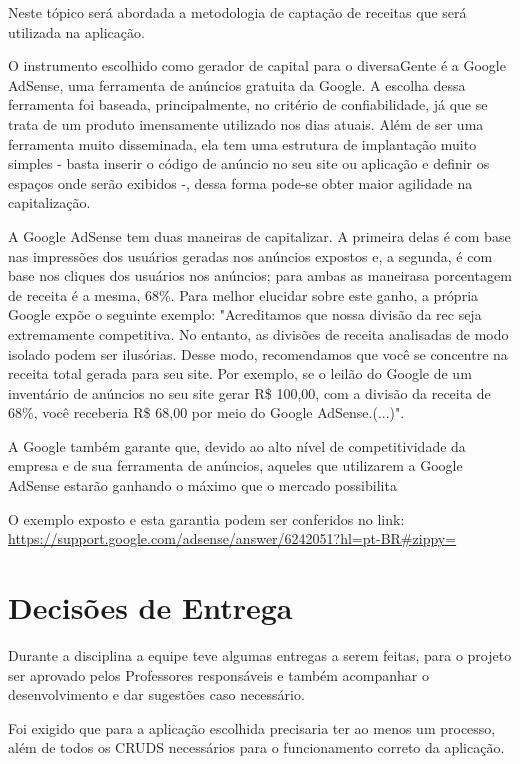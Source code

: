 Neste tópico será abordada a metodologia de captação de receitas que será utilizada na aplicação.

O instrumento escolhido como gerador de capital para o diversaGente é a Google AdSense, uma ferramenta de anúncios gratuita da Google. A escolha dessa ferramenta foi baseada, principalmente, no critério de confiabilidade, já que se trata de um produto imensamente utilizado nos dias atuais. Além de ser uma ferramenta muito disseminada, ela tem uma estrutura de implantação muito simples - basta inserir o código de anúncio no seu site ou aplicação e definir os espaços onde serão exibidos -, dessa forma pode-se obter maior agilidade na capitalização.

A Google AdSense tem duas maneiras de capitalizar. A primeira delas é com base nas impressões dos usuários geradas nos anúncios expostos e, a segunda, é com base nos cliques dos usuários nos anúncios; para ambas as maneirasa porcentagem de receita é a mesma, 68\%. Para melhor elucidar sobre este ganho, a própria Google expõe o seguinte exemplo: "Acreditamos que nossa divisão da rec seja extremamente competitiva. No entanto, as divisões de receita analisadas de modo isolado podem ser ilusórias. Desse modo, recomendamos que você se concentre na receita total gerada para seu site. Por exemplo, se o leilão do Google de um inventário de anúncios no seu site gerar R\$ 100,00, com a divisão da receita de 68\%, você receberia R\$ 68,00 por meio do Google AdSense.(...)". 

A Google também garante que, devido ao alto nível de competitividade da empresa e de sua ferramenta de anúncios, aqueles que utilizarem a Google AdSense estarão ganhando o máximo que o mercado possibilita

O exemplo exposto e esta garantia podem ser conferidos no link:\\ \hyperlink{Link da Google AdSense}{https://support.google.com/adsense/answer/6242051?hl=pt-BR#zippy=}

\section{Decisões de Entrega}

Durante a disciplina a equipe teve algumas entregas a serem feitas, para o projeto ser aprovado pelos Professores responsáveis e também acompanhar o desenvolvimento e dar sugestões caso necessário. 

Foi exigido que para a aplicação escolhida precisaria ter ao menos um processo, além de todos os CRUDS necessários para o funcionamento correto da aplicação. 

